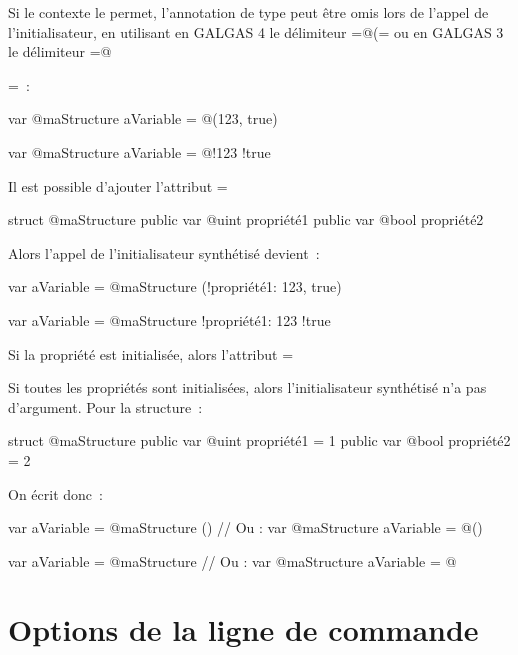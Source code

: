 Si le contexte le permet, l'annotation de type peut être omis lors de l'appel de l'initialisateur, en utilisant en GALGAS 4 le délimiteur \ggsq=@(= ou en GALGAS 3 le délimiteur \ggst=@{=~:
\begin{galgas34}
var @maStructure aVariable = @(123, true)
\end{galgas34}
\begin{galgas3}
var @maStructure aVariable = @{!123 !true}
\end{galgas3}


Il est possible d'ajouter l'attribut \ggsq=%
\begin{galgas3}
struct @maStructure {
  public var @uint propriété1 %
  public var @bool propriété2
}
\end{galgas3}

Alors l'appel de l'initialisateur synthétisé devient~:
\begin{galgas4}
var aVariable = @maStructure (!propriété1: 123, true)
\end{galgas4}
\begin{galgas3}
var aVariable = @maStructure {!propriété1: 123 !true}
\end{galgas3}

Si la propriété est initialisée, alors l'attribut \ggsq=%


Si toutes les propriétés sont initialisées, alors l'initialisateur synthétisé n'a pas d'argument. Pour la structure~:
\begin{galgas34}
struct @maStructure {
  public var @uint propriété1 = 1
  public var @bool propriété2 = 2
}
\end{galgas34}

On écrit donc~:
\begin{galgas34}
var aVariable = @maStructure ()
// Ou :
var @maStructure aVariable = @()
\end{galgas34}
\begin{galgas3}
var aVariable = @maStructure {}
// Ou :
var @maStructure aVariable = @{}
\end{galgas3}









\section{Options de la ligne de commande}

}
